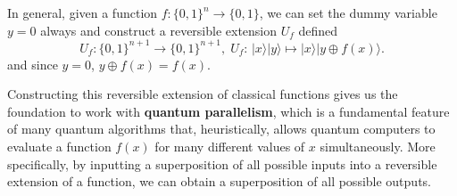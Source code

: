 \documentclass{article}
\begin{document}
    \begin{definition}
      In general, given a function $f: \{0, 1\}^n \rightarrow \{0, 1\}$, we can set the dummy variable $y = 0$ always and construct a reversible extension $U_f$ defined 
      \begin{equation} 
        U_f: \{0, 1\}^{n+1} \longrightarrow \{0, 1\}^{n+1}, \; U_f: \, |x \rangle |y\rangle \mapsto |x\rangle |y \oplus f(x) \rangle.
      \end{equation} 
      and since $y = 0$, $y \oplus f(x) = f(x)$.
    \end{definition}

    Constructing this reversible extension of classical functions gives us the foundation to work with \textbf{quantum parallelism}, which is a fundamental feature of many quantum algorithms that, heuristically, allows quantum computers to evaluate a function $f(x)$ for many different values of $x$ simultaneously. More specifically, by inputting a superposition of all possible inputs into a reversible extension of a function, we can obtain a superposition of all possible outputs. 
\end{document}
